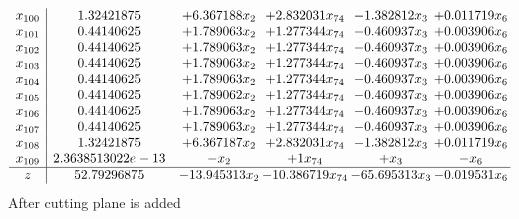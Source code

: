 \documentclass[11pt]{article}
\begin{document}
\[\begin{array}{c| c c@{\hskip 2pt} c@{\hskip 2pt} c@{\hskip 2pt} c@{\hskip 2pt} }
 x_{100}   &  1.32421875 & + 6.367188 x_{2} & + 2.832031 x_{74} & -1.382812 x_{3} & + 0.011719 x_{6}\\
 x_{101}   &  0.44140625 & + 1.789063 x_{2} & + 1.277344 x_{74} & -0.460937 x_{3} & + 0.003906 x_{6}\\
 x_{102}   &  0.44140625 & + 1.789063 x_{2} & + 1.277344 x_{74} & -0.460937 x_{3} & + 0.003906 x_{6}\\
 x_{103}   &  0.44140625 & + 1.789063 x_{2} & + 1.277344 x_{74} & -0.460937 x_{3} & + 0.003906 x_{6}\\
 x_{104}   &  0.44140625 & + 1.789063 x_{2} & + 1.277344 x_{74} & -0.460937 x_{3} & + 0.003906 x_{6}\\
 x_{105}   &  0.44140625 & + 1.789062 x_{2} & + 1.277344 x_{74} & -0.460937 x_{3} & + 0.003906 x_{6}\\
 x_{106}   &  0.44140625 & + 1.789063 x_{2} & + 1.277344 x_{74} & -0.460937 x_{3} & + 0.003906 x_{6}\\
 x_{107}   &  0.44140625 & + 1.789063 x_{2} & + 1.277344 x_{74} & -0.460937 x_{3} & + 0.003906 x_{6}\\
 x_{108}   &  1.32421875 & + 6.367187 x_{2} & + 2.832031 x_{74} & -1.382812 x_{3} & + 0.011719 x_{6}\\
 x_{109}   &  2.3638513022e-13 & - x_{2} & + 1 x_{74} & +  x_{3} & - x_{6}\\
\hline
z    &  52.79296875 & -13.945313 x_{2} & -10.386719 x_{74} & -65.695313 x_{3} & -0.019531 x_{6}\\
\end{array}\]
 After cutting plane is added 
\end{document}
